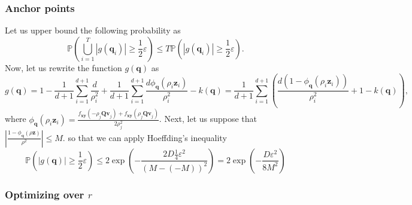\subsubsection{Anchor points}
Let us upper bound the following probability as
\[
\mathbb{P}\left (\bigcup\limits_{i = 1}^T |g(\mathbf{q}_i)| \geq \frac12 \varepsilon \right) \leq
T \mathbb{P}\left ( |g(\mathbf{q}_i)| \geq \frac12 \varepsilon\right).
\]
Now, let us rewrite the function $g(\mathbf{q})$ as
\[
g(\mathbf{q}) = 1 - \frac{1}{d + 1}\sum_{i = 1}^{d + 1} \frac{d}{\rho_i^2} +
\frac{1}{d + 1} \sum_{i = 1}^{d + 1} \frac{d \phi_{\mathbf{q}}(\rho_i\mathbf{z}_i)}{\rho_i^2} - k(\mathbf{q}) = \frac{1}{d + 1}\sum_{i = 1}^{d + 1} \left (
\frac{d(1 - \phi_\mathbf{q}(\rho_i \mathbf{z}_i))}{\rho_i^2} + 1 - k(\mathbf{q})
\right ),
\]
where $\phi_{\mathbf{q}}(\rho_i \mathbf{z}_i) = \frac{f_{\mathbf{xy}}(-\rho_j \mathbf{Qv}_j) + f_{\mathbf{xy}}(\rho_j \mathbf{Qv}_j)}{2 \rho_j^2}$.
Next, let us suppose that $\left |\frac{1 - \phi_{\mathbf{q}}(\rho \mathbf{z})}{\rho^2} \right | \leq M$.
so that we can apply Hoeffding's inequality
\[
\mathbb{P}(|g(\mathbf{q})| \geq \frac12 \varepsilon) \leq
2 \exp \left (
-\frac{2D \frac14 \varepsilon^2}{(M - (-M))^2}
\right ) =
2 \exp \left (
-\frac{D\varepsilon^2}{8M^2}
\right )
\]


\subsubsection{Optimizing over $r$}

